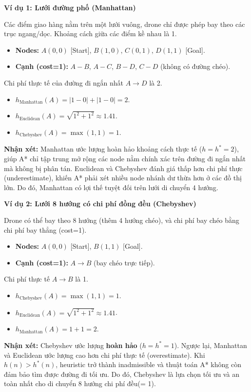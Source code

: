 \documentclass[13pt,a4paper]{article}
\begin{document}
\textbf{Ví dụ 1: Lưới đường phố (Manhattan)}

Các điểm giao hàng nằm trên một lưới vuông, drone chỉ được phép bay theo các trục ngang/dọc. Khoảng cách giữa các điểm kề nhau là 1.
\begin{itemize}
    \item \textbf{Nodes:} $A(0,0)$ [Start], $B(1,0)$, $C(0,1)$, $D(1,1)$ [Goal].
    \item \textbf{Cạnh (cost=1):} $A-B$, $A-C$, $B-D$, $C-D$ (không có đường chéo).
\end{itemize}

Chi phí thực tế của đường đi ngắn nhất $A \to D$ là 2.
\begin{itemize}
    \item $h_{\text{Manhattan}}(A) = |1-0| + |1-0| = 2$.
    \item $h_{\text{Euclidean}}(A) = \sqrt{1^2+1^2} \approx 1.41$.
    \item $h_{\text{Chebyshev}}(A) = \max(1, 1) = 1$.
\end{itemize}
\textbf{Nhận xét:} Manhattan ước lượng hoàn hảo khoảng cách thực tế ($h=h^*=2$), giúp A* chỉ tập trung mở rộng các node nằm chính xác trên đường đi ngắn nhất mà không bị phân tán. Euclidean và Chebyshev đánh giá thấp hơn chi phí thực (underestimate), khiến A* phải xét nhiều node nhánh dư thừa hơn ở các đồ thị lớn. Do đó, Manhattan có lợi thế tuyệt đối trên lưới di chuyển 4 hướng.

\textbf{Ví dụ 2: Lưới 8 hướng có chi phí đồng đều (Chebyshev)}

Drone có thể bay theo 8 hướng (thêm 4 hướng chéo), và chi phí bay chéo bằng chi phí bay thẳng (cost=1).
\begin{itemize}
    \item \textbf{Nodes:} $A(0,0)$ [Start], $B(1,1)$ [Goal].
    \item \textbf{Cạnh (cost=1):} $A \to B$ (bay chéo trực tiếp).
\end{itemize}

Chi phí thực tế $A \to B$ là 1.
\begin{itemize}
    \item $h_{\text{Chebyshev}}(A) = \max(1, 1) = 1$.
    \item $h_{\text{Euclidean}}(A) = \sqrt{1^2+1^2} \approx 1.41$.
    \item $h_{\text{Manhattan}}(A) = 1 + 1 = 2$.
\end{itemize}
\textbf{Nhận xét:} Chebyshev ước lượng \textbf{hoàn hảo} ($h=h^*=1$). Ngược lại, Manhattan và Euclidean ước lượng cao hơn chi phí thực tế (overestimate). Khi $h(n) > h^*(n)$, heuristic trở thành inadmissible và thuật toán A* không còn đảm bảo tìm được đường đi tối ưu. Do đó, Chebyshev là lựa chọn tối ưu và an toàn nhất cho di chuyển 8 hướng chi phí đều(= 1).
\end{document}
